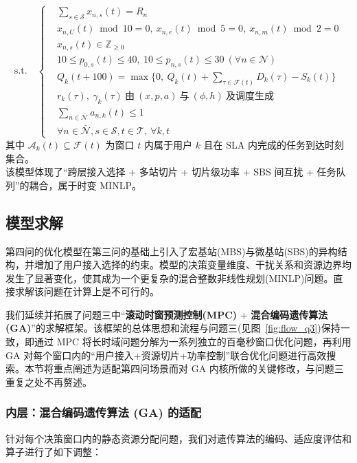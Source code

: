 \begin{equation}
\text{s.t.}\quad 
\left\{
\begin{aligned}
& \sum_{s\in\mathcal{S}} x_{n,s}(t)=R_n\\
& x_{n,U}(t)\bmod 10=0,\ x_{n,e}(t)\bmod 5=0,\ x_{n,m}(t)\bmod 2=0\\
& x_{n,s}(t)\in\mathbb{Z}_{\ge 0}\\
& 10\le p_{0,s}(t)\le 40,\ 10\le p_{n,s}(t)\le 30\ (\forall n\in\mathcal{N})\\
& Q_k(t+100)=\max\Big\{0,\ Q_k(t)+\sum_{\tau\in\mathcal{F}(t)} D_k(\tau)-S_k(t)\Big\}\\
& r_k(\tau),\ \gamma_k(\tau)\ \text{由}\ (x,p,a)\ \text{与}\ (\phi,h)\ \text{及调度生成}\\
& \sum_{n\in\bar{\mathcal{N}}} a_{n,k}(t)\le 1\\
& \forall n\in\bar{\mathcal{N}},s\in\mathcal{S},t\in\mathcal{T},\ \forall k,t
\end{aligned}
\right.
\end{equation}
其中 $\mathcal{A}_k(t)\subseteq\mathcal{F}(t)$ 为窗口 $t$ 内属于用户 $k$ 且在 SLA 内完成的任务到达时刻集合。\\
该模型体现了“跨层接入选择 + 多站切片 + 切片级功率 + SBS 间互扰 + 任务队列”的耦合，属于时变 MINLP。

\subsection{模型求解}

第四问的优化模型在第三问的基础上引入了宏基站(MBS)与微基站(SBS)的异构结构，并增加了用户接入选择的约束。模型的决策变量维度、干扰关系和资源边界均发生了显著变化，使其成为一个更复杂的混合整数非线性规划(MINLP)问题。直接求解该问题在计算上是不可行的。

我们延续并拓展了问题三中“\textbf{滚动时窗预测控制(MPC)} + \textbf{混合编码遗传算法(GA)}”的求解框架。该框架的总体思想和流程与问题三(见图~\ref{fig:flow_q3})保持一致，即通过 MPC 将长时域问题分解为一系列独立的百毫秒窗口优化问题，再利用 GA 对每个窗口内的“用户接入+资源切片+功率控制”联合优化问题进行高效搜索。本节将重点阐述为适配第四问场景而对 GA 内核所做的关键修改，与问题三重复之处不再赘述。

\subsubsection{内层：混合编码遗传算法 (GA) 的适配}

针对每个决策窗口内的静态资源分配问题，我们对遗传算法的编码、适应度评估和算子进行了如下调整：

